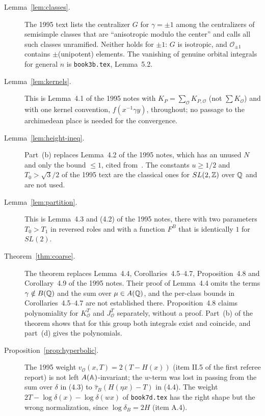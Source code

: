 \begin{description}
\item[Lemma~\ref{lem:classes}.] The 1995 text lists the centralizer $G$ for $\gamma=\pm1$ among the centralizers of semisimple classes that are ``anisotropic modulo the center'' and calls all such classes unramified. Neither holds for $\pm1$: $G$ is isotropic, and $\mathcal O_{\pm1}$ contains $\pm$(unipotent) elements. The vanishing of genuine orbital integrals for general $n$ is \texttt{book3b.tex}, Lemma~5.2.

\item[Lemma~\ref{lem:kernels}.] This is Lemma~4.1 of the 1995 notes with $K_P=\sum_{\mathcal O}
K_{P,\mathcal O}$ (not $\sum K_{\mathcal O}$) and with one kernel
convention, $f(x^{-1}\gamma y)$, throughout; no passage to the
archimedean place is needed for the convergence.

\item[Lemma~\ref{lem:height-ineq}.] Part~(b) replaces Lemma~4.2 of the 1995 notes, which has an unused $N$ and only the bound $\le1$, cited from~\cite{A2}. The constants $u\ge1/2$ and $T_0>\sqrt3/2$ of the 1995 text are the classical ones for $SL(2,\mathbb{Z})$ over $\mathbb{Q}$ and are not used.

\item[Lemma~\ref{lem:partition}.] This is Lemma~4.3 and (4.2) of the 1995 notes, there with two parameters $T_0>T_1$ in reversed roles and with a function $F^B$ that is identically $1$ for $SL(2)$.

\item[Theorem~\ref{thm:coarse}.] The theorem replaces Lemma~4.4, Corollaries~4.5--4.7, Proposition~4.8 and Corollary~4.9 of the 1995 notes. Their proof of Lemma~4.4 omits the terms $\gamma\notin B(\mathbb{Q})$ and the sum over $\mu\in A(\mathbb{Q})$, and the per-class bounds in Corollaries~4.5--4.7 are not established there. Proposition~4.8 claims polynomiality for $K^T_{\mathcal O}$ and $J^T_{\mathcal O}$ separately, without a proof. Part~(b) of the theorem shows that for this group both integrals exist and coincide, and part~(d) gives the polynomials.

\item[Proposition~\ref{prop:hyperbolic}.] The 1995 weight $v_{\mathcal O}(x,T)=2(T-H(x))$ (item II.5 of the first referee report) is not left $A(\mathbb{A})$-invariant; the $w$-term was lost in passing from the sum over $\delta$ in (4.3) to $\hat\tau_B(H(\eta x)-T)$ in (4.4). The weight $2T-\log\delta(x)-\log\delta(wx)$ of \texttt{book7d.tex} has the right shape but the wrong normalization, since $\log\delta_B=2H$ (item A.4).


\end{description}
